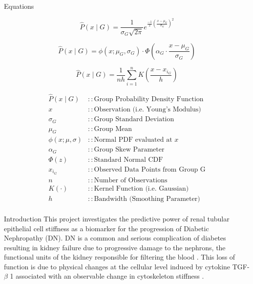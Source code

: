 \documentclass[a0paper,portrait]{baposter}
\begin{document}
\begin{poster}
\begin{posterbox}[name=equation,column=0,below=abstract,above=bottom]{Equations}
\begin{small}
\begin{equation}
  \hat{P}(x \mid G) =  
  \frac{1}{\sigma_{G} \sqrt{2 \pi}}  
  e^{\tfrac{-1}{2}  
  \left( \tfrac{x-\mu_{G}}{\sigma_{G}}\right)^{2}}  
  \label{eq:gaussian}
\end{equation}

\begin{equation}
  \hat{P}(x \mid G) =  
  \phi\left(x; \mu_G, \sigma_G \right)
  \cdot  
  \Phi\left(  
  \alpha_G \cdot \frac{x - \mu_G}{\sigma_G}  
  \right)
  \label{eq:skewnorm}
\end{equation}

\begin{equation}
  \hat{P}(x \mid G) =  
  \frac{1}{n h} \sum_{i=1}^{n} K\left( \frac{x - x_{i_G}}{h} \right)  
  \label{eq:kde}
\end{equation}

\begin{align*}
  \hat{P}(x \mid G)     &:: \text{Group Probability Density Function}\\
  x                     &:: \text{Observation (i.e. Young's Modulus)}\\
  \sigma_{G}            &:: \text{Group Standard Deviation}\\
  \mu_{G}               &:: \text{Group Mean}\\
  \phi(x; \mu, \sigma)  &:: \text{Normal PDF evaluated at } x \\
  \alpha_G              &:: \text{Group Skew Parameter} \\
  \Phi(z)               &:: \text{Standard Normal CDF} \\
  x_{i_G}               &:: \text{Observed Data Points from Group G}\\
  n                     &:: \text{Number of Observations}\\
  K(\cdot)              &:: \text{Kernel Function (i.e. Gaussian)}\\
  h                     &:: \text{Bandwidth (Smoothing Parameter)}\\
\end{align*}
\end{small}

\end{posterbox}

\begin{posterbox}[name=intro,span=2,column=1,row=0]{Introduction}
This project investigates the predictive power of renal tubular epithelial cell stiffness as a biomarker for the progression of Diabetic Nephropathy (DN). 
DN is a common and serious complication of diabetes resulting in kidney failure due to progressive damage to the nephrons, the functional units of the kidney responsible for filtering the blood \cite{metcalfeW2007-HowDoesEarlyChronicKidneyDiseaseProgress}.
This loss of function is due to physical changes at the cellular level induced by cytokine TGF-$\beta$ 1 associated with an observable change in cytoskeleton stiffness \cite{hillsCE2012-TGFvModulatesCelltocell}. 


\end{posterbox}
\end{poster}
\end{document}
